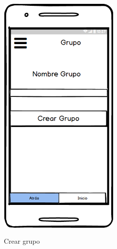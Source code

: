 \begin{figure}[htbp]
\begin{minipage}[b]{0.5\linewidth}
\end{minipage}
\end{figure}










	
	\begin{figure}[htbp]
\begin{minipage}[b]{0.5\linewidth} %
\centering
\includegraphics[width=6cm]{maqueta/Crear-Grupo.png}
 \label{figura1}
\caption{Crear grupo}


\end{minipage}
\end{figure}
